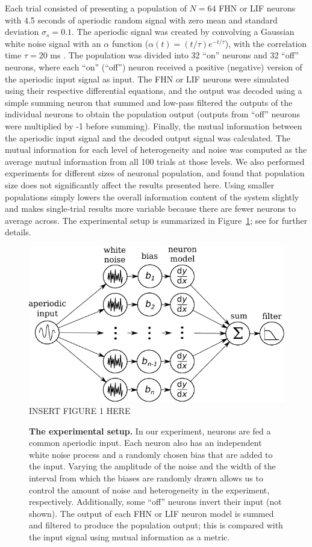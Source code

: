 \documentclass[12pt]{article}
\begin{document}
Each trial consisted of presenting a population of $N = 64$ FHN or LIF neurons with 4.5 seconds of aperiodic random signal with zero mean and standard deviation $\sigma_s = 0.1$.
The aperiodic signal was created by convolving a Gaussian white noise signal with an $\alpha$ function ($\alpha(t) = (t / \tau) e^{-t / \tau}$), with the correlation time $\tau = 20$ ms \citep{Mainen1995}.
The population was divided into 32 ``on'' neurons and 32 ``off'' neurons, where each ``on'' (``off'') neuron received a positive (negative) version of the aperiodic input signal as input. The FHN or LIF neurons were simulated using their respective differential equations, and the output was decoded using a simple summing neuron that summed and low-pass filtered the outputs of the individual neurons to obtain the population output (outputs from ``off'' neurons were multiplied by -1 before summing). Finally, the mutual information between the aperiodic input signal and the decoded output signal was calculated. The mutual information for each level of heterogeneity and noise was computed as the average mutual information from all 100 trials at those levels.
We also performed experiments for different sizes of neuronal population, and found that population size does not significantly affect the results presented here. Using smaller populations simply lowers the overall information content of the system slightly and makes single-trial results more variable because there are fewer neurons to average across.
The experimental setup is summarized in Figure~\ref{fig:exp}; see \textsc{} for further details.

\begin{figure}
  \ifx\hidefigures\undefined
    \centering
    \includegraphics{figure1_experiment.pdf}
  \else
    INSERT FIGURE 1 HERE
  \fi
  \caption{
    \textbf{The experimental setup.} In our experiment, neurons are fed a common aperiodic input. Each neuron also has an independent white noise process and a randomly chosen bias that are added to the input. Varying the amplitude of the noise and the width of the interval from which the biases are randomly drawn allows us to control the amount of noise and heterogeneity in the experiment, respectively. Additionally, some ``off'' neurons invert their input (not shown). The output of each FHN or LIF neuron model is summed and filtered to produce the population output; this is compared with the input signal using mutual information as a metric.
  }
  \label{fig:exp}
\end{figure}
\end{document}
